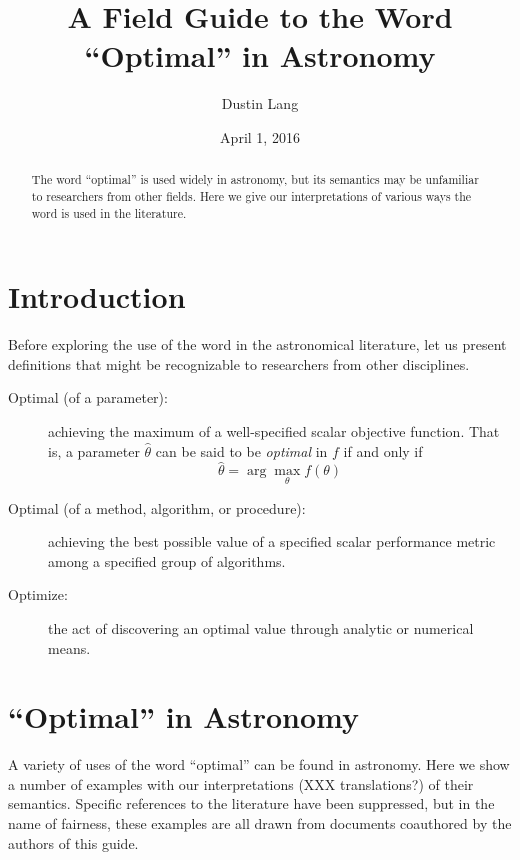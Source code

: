 \documentclass[12pt, preprint]{aastex}
\begin{document}
\title{A Field Guide to the Word ``Optimal'' in Astronomy}

\author{%
Dustin Lang%
}
\date{April 1, 2016}

\begin{abstract}
The word ``optimal'' is used widely in astronomy, but its semantics
may be unfamiliar to researchers from other fields.  Here we give
our interpretations of various ways the word is used in the literature.
\end{abstract}


\section{Introduction}

Before exploring the use of the word in the astronomical literature, let
us present definitions that might be recognizable to researchers from other
disciplines.

\begin{description}
\item[Optimal (of a parameter):] achieving the maximum of a
  well-specified scalar objective function.  That is, a parameter
  $\hat{\theta}$ can be said to be \emph{optimal} in $f$ if and only
  if
  \[
  \hat{\theta} = \arg\max_{\theta} f(\theta)
  \]
\item[Optimal (of a method, algorithm, or procedure):] achieving the
  best possible value of a specified scalar performance metric among a
  specified group of algorithms.
\item[Optimize:] the act of discovering an optimal value through analytic or
  numerical means.
\end{description}

\section{``Optimal'' in Astronomy}

A variety of uses of the word ``optimal'' can be found in astronomy.
Here we show a number of examples with our interpretations (XXX
translations?) of their semantics.
%
Specific references to the literature have been suppressed, but in the
name of fairness, these examples are all drawn from documents
coauthored by the authors of this guide.
\end{document}
